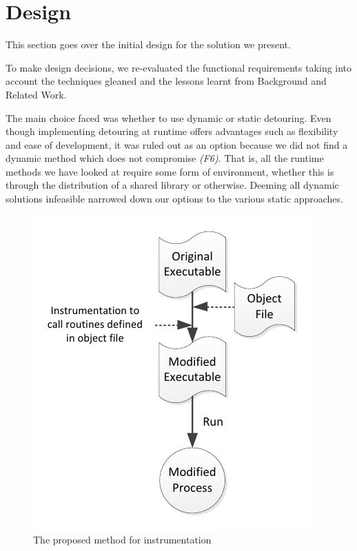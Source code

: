 \chapter{Design}

This section goes over the initial design for the solution we present.

To make design decisions, we re-evaluated the functional requirements taking into account the techniques gleaned and the lessons learnt from Background and Related Work.

The main choice faced was whether to use dynamic or static detouring. Even though implementing detouring at runtime offers advantages such as flexibility and ease of development, it was ruled out as an option because we did not find a dynamic method which does not compromise \emph{(F6)}. That is, all the runtime methods we have looked at require some form of environment, whether this is through the distribution of a shared library or otherwise. Deeming all dynamic solutions infeasible narrowed down our options to the various static approaches.

\begin{figure}[H]
 \centering
 \includegraphics{Workflow.pdf}
 \caption[Hierarchy]{The proposed method for instrumentation}
\end{figure}



